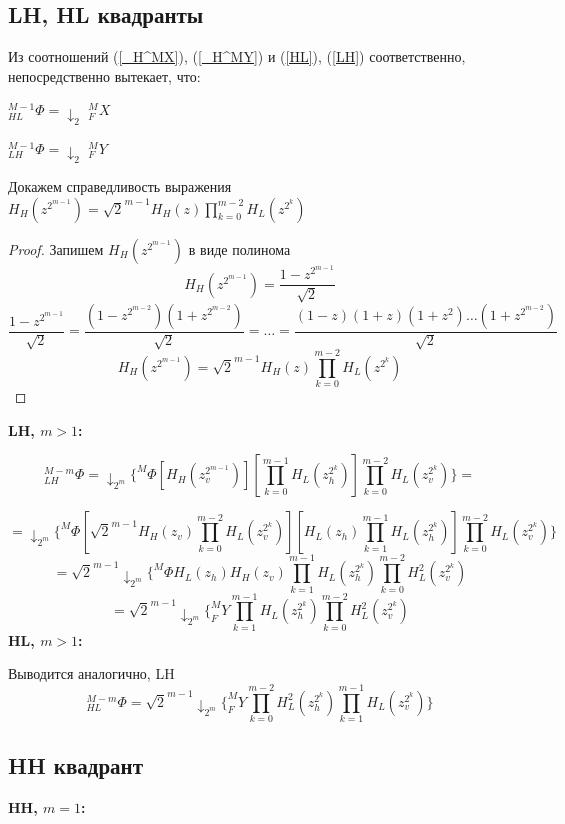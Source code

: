 \documentclass[oneside, final, 14pt]{article}
\begin{document}
\subsection{LH, HL квадранты}
Из соотношений (\ref{_H^MX}), (\ref{_H^MY}) и (\ref{HL}), (\ref{LH}) соответственно, непосредственно вытекает, что:
\begin{center}

$ 	_{HL}^{M-1}\Phi = \downarrow_{2}$ $ _F^MX $ 

$ 	_{LH}^{M-1}\Phi = \downarrow_{2}$ $ _F^MY $

\end{center}

Докажем справедливость выражения $H_{H}(z^{2^{m-1}}) = \sqrt{2}^{m-1} H_H(z) \prod \limits_{k=0}^{m-2} H_L(z^{2^k})$
\begin{proof}
Запишем $H_{H}(z^{2^{m-1}})$ в виде полинома
$$H_{H}(z^{2^{m-1}}) = \frac{1 - z^{2^{m-1}}}{\sqrt{2}}$$
$$\frac{1 - z^{2^{m-1}}}{\sqrt{2}} = \frac{(1-z^{2^{m-2}})(1+z^{2^{m-2}})}{\sqrt{2}}=\ldots=\frac{(1-z)(1+z)(1+z^2)\ldots(1+z^{2^{m-2}})}{\sqrt{2}}$$
$$H_{H}(z^{2^{m-1}}) = \sqrt{2}^{m-1} H_H(z) \prod \limits_{k=0}^{m-2} H_L(z^{2^k})$$
\end{proof}

\textbf{LH, $m>1$:}

\[
_{LH}^{M-m}\Phi=
\downarrow_{2^m} \{^M\Phi [H_H(z_v^{2^{m-1}})] [\prod\limits_{k = 0}^{m-1} H_L(z_h^{2^k})]
							\prod\limits_{k = 0}^{m-2} H_L(z_v^{2^k})\}=\]
							
\[
=\downarrow_{2^m} \{^M\Phi [\sqrt{2}^{m-1} H_H(z_v) \prod \limits_{k=0}^{m-2} H_L(z_v^{2^k})]
					[H_L(z_h)\prod \limits_{k=1}^{m-1} H_L(z_h^{2^k})]
					\prod\limits_{k = 0}^{m-2} H_L(z_v^{2^k})
\}			
\]
\[
=\sqrt{2}^{m-1} \downarrow_{2^m} \{^M\Phi H_L(z_h) H_H(z_v)\prod \limits_{k=1}^{m-1} H_L(z_h^{2^k})\prod \limits_{k=0}^{m-2} H_L^2(z_v^{2^k})
\]
\[
=\sqrt{2}^{m-1} \downarrow_{2^m} \{_F^MY \prod \limits_{k=1}^{m-1} H_L(z_h^{2^k})\prod \limits_{k=0}^{m-2} H_L^2(z_v^{2^k})
\]
\textbf{HL, $m>1$:}

Выводится аналогично, LH
\[_{HL}^{M-m}\Phi=
\sqrt{2}^{m-1} \downarrow_{2^m} \{_F^MY \prod \limits_{k=0}^{m-2} H_L^{2}(z_h^{2^k})\prod \limits_{k=1}^{m-1} H_L(z_v^{2^k})\}
\]

\subsection{HH квадрант}
\textbf{HH, $m=1$:}\cite{new_method2}
\end{document}
